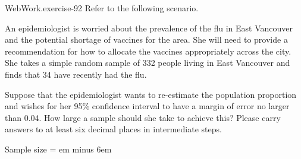 \documentclass[10pt,]{book}
\newcommand{\fillin}[1]{\leavevmode\leaders\vrule height -1.2pt depth 1.5pt \hskip #1em minus #1em \null}
\numberwithin{equation}{section}
\begin{document}
\begin{inlineexercise}{WebWork.}{exercise-92}%
\hypertarget{p-1370}{}%
Refer to the following scenario.%
\par
\hypertarget{p-1371}{}%
An epidemiologist is worried about the prevalence of the flu in East Vancouver and the potential shortage of vaccines for the area. She will need to provide a recommendation for how to allocate the vaccines appropriately across the city. She takes a simple random sample of 332 people living in East Vancouver and finds that 34 have recently had the flu.%
\par
\hypertarget{p-1372}{}%
Suppose that the epidemiologist wants to re-estimate the population proportion and wishes for her 95\% confidence interval to have a margin of error no larger than 0.04.  How large a sample should she take to achieve this? Please carry answers to at least six decimal places in intermediate steps.%
\par
\hypertarget{p-1373}{}%
Sample size =  \fillin{6}%
\end{inlineexercise}
%
%
%
\typeout{************************************************}
\typeout{************************************************}
%
\end{document}
